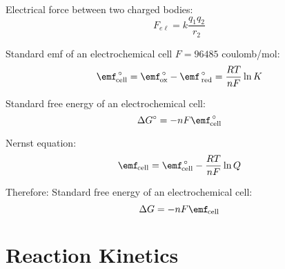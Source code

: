 \documentclass[10pt]{article}
\begin{document}
Electrical force between two charged bodies:
\begin{equation*}
F_{e\ell}=k\frac{q_1q_2}{r_2}
\end{equation*}

Standard emf of an electrochemical cell $F=96485$ coulomb/mol:
\begin{equation*}
\textnormal{\Enotcell} = \textnormal{$\emf^{\hspace*{.5mm}\circ}_{\hspace*{-.3mm}\textnormal{ox}}$} - \textnormal{$\emf^{\hspace*{.5mm}\circ}_{\hspace*{.5mm}\textnormal{red}}$}  = \frac{RT}{nF} \ln K
\end{equation*}

Standard free energy of an electrochemical cell:
\begin{equation*}
\Delta G\not = -nF\textnormal{\Enotcell}
\end{equation*}

Nernst equation:
\begin{equation*}
\textnormal{\Ecell} = \textnormal{\Enotcell} - \frac{RT}{nF}\ln Q
\end{equation*}

Therefore:
Standard free energy of an electrochemical cell:
\begin{equation*}
\Delta G = -nF\textnormal{\Ecell}
\end{equation*}

\section{Reaction Kinetics}
\end{document}
